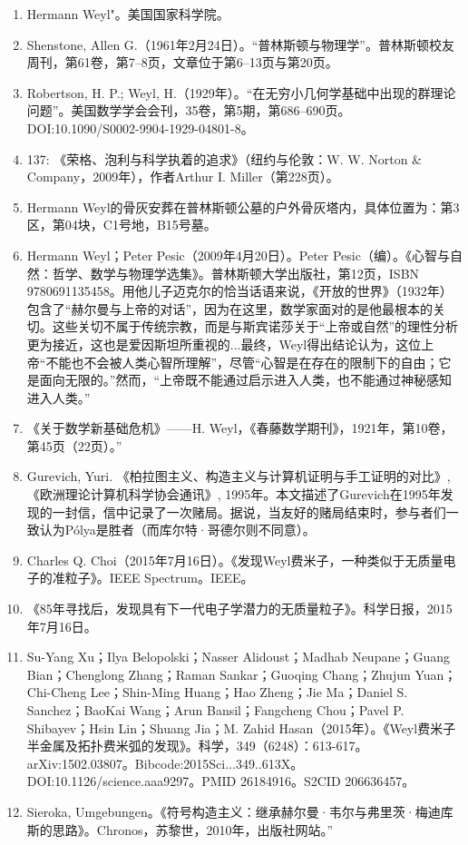 \begin{enumerate}
\item Hermann Weyl"。美国国家科学院。
\item Shenstone, Allen G.（1961年2月24日）。“普林斯顿与物理学”。普林斯顿校友周刊，第61卷，第7–8页，文章位于第6–13页与第20页。
\item Robertson, H. P.; Weyl, H.（1929年）。“在无穷小几何学基础中出现的群理论问题”。美国数学学会会刊，35卷，第5期，第686–690页。DOI:10.1090/S0002-9904-1929-04801-8。
\item 137: 《荣格、泡利与科学执着的追求》（纽约与伦敦：W. W. Norton & Company，2009年），作者Arthur I. Miller（第228页）。
\item Hermann Weyl的骨灰安葬在普林斯顿公墓的户外骨灰塔内，具体位置为：第3区，第04块，C1号地，B15号墓。
\item Hermann Weyl；Peter Pesic（2009年4月20日）。Peter Pesic（编）。《心智与自然：哲学、数学与物理学选集》。普林斯顿大学出版社，第12页，ISBN 9780691135458。用他儿子迈克尔的恰当话语来说，《开放的世界》（1932年）包含了“赫尔曼与上帝的对话”，因为在这里，数学家面对的是他最根本的关切。这些关切不属于传统宗教，而是与斯宾诺莎关于“上帝或自然”的理性分析更为接近，这也是爱因斯坦所重视的...最终，Weyl得出结论认为，这位上帝“不能也不会被人类心智所理解”，尽管“心智是在存在的限制下的自由；它是面向无限的。”然而，“上帝既不能通过启示进入人类，也不能通过神秘感知进入人类。”
\item 《关于数学新基础危机》——H. Weyl，《春藤数学期刊》，1921年，第10卷，第45页（22页）。”
\item Gurevich, Yuri. 《柏拉图主义、构造主义与计算机证明与手工证明的对比》, 《欧洲理论计算机科学协会通讯》, 1995年。本文描述了Gurevich在1995年发现的一封信，信中记录了一次赌局。据说，当友好的赌局结束时，参与者们一致认为Pólya是胜者（而库尔特·哥德尔则不同意）。
\item Charles Q. Choi（2015年7月16日）。《发现Weyl费米子，一种类似于无质量电子的准粒子》。IEEE Spectrum。IEEE。
\item 《85年寻找后，发现具有下一代电子学潜力的无质量粒子》。科学日报，2015年7月16日。
\item Su-Yang Xu；Ilya Belopolski；Nasser Alidoust；Madhab Neupane；Guang Bian；Chenglong Zhang；Raman Sankar；Guoqing Chang；Zhujun Yuan；Chi-Cheng Lee；Shin-Ming Huang；Hao Zheng；Jie Ma；Daniel S. Sanchez；BaoKai Wang；Arun Bansil；Fangcheng Chou；Pavel P. Shibayev；Hsin Lin；Shuang Jia；M. Zahid Hasan（2015年）。《Weyl费米子半金属及拓扑费米弧的发现》。科学，349（6248）：613-617。arXiv:1502.03807。Bibcode:2015Sci...349..613X。DOI:10.1126/science.aaa9297。PMID 26184916。S2CID 206636457。
\item Sieroka, Umgebungen。《符号构造主义：继承赫尔曼·韦尔与弗里茨·梅迪库斯的思路》。Chronos，苏黎世，2010年，出版社网站。”

\end{enumerate}